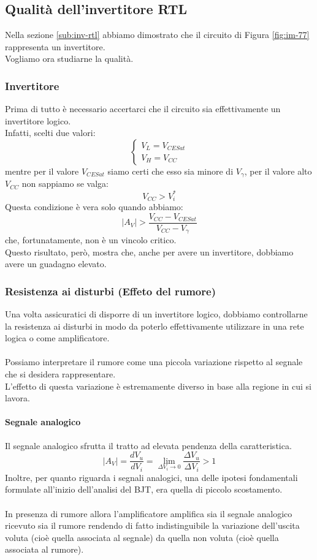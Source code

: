 \documentclass[../main.tex]{subfiles}
\begin{document}
	\subsection{Qualità dell'invertitore RTL}
	Nella sezione \ref{sub:inv-rtl} abbiamo dimostrato che il circuito di Figura \ref{fig:im-77} rappresenta un invertitore. \\
	Vogliamo ora studiarne la qualità.
	\subsubsection{Invertitore}
	Prima di tutto è necessario accertarci che il circuito sia effettivamente un invertitore logico. \\
	Infatti, scelti due valori:
	$$\begin{cases} V_L = V_{CESat} \\ V_H = V_{CC} \end{cases}$$
	mentre per il valore $V_{CESat}$ siamo certi che esso sia minore di $V_\gamma$, per il valore alto $V_{CC}$ non sappiamo se valga:
	$$V_{CC} > V_i^*$$
	Questa condizione è vera solo quando abbiamo:
	$$|A_V| > \frac{V_{CC} - V_{CESat}}{V_{CC} - V_\gamma}$$
	che, fortunatamente, non è un vincolo critico. \\
	Questo risultato, però, mostra che, anche per avere un invertitore, dobbiamo avere un guadagno elevato.
	\subsubsection{Resistenza ai disturbi (Effeto del rumore)}
	\label{subsub:res-dist}
	Una volta assicuratici di disporre di un invertitore logico, dobbiamo controllarne la resistenza ai disturbi in modo da poterlo effettivamente utilizzare in una rete logica o come amplificatore.\\\\
	Possiamo interpretare il rumore come una piccola variazione rispetto al segnale che si desidera rappresentare. \\
	L’effetto di questa variazione è estremamente diverso in base alla regione in cui si lavora.
	\paragraph{Segnale analogico}
	Il segnale analogico sfrutta il tratto ad elevata pendenza della caratteristica.
	$$|A_V| = \frac{dV_u}{dV_i} = \lim_{\Delta V_i \rightarrow 0} \frac{\Delta V_u}{\Delta V_i} > 1$$
	Inoltre, per quanto riguarda i segnali analogici, una delle ipotesi fondamentali formulate all’inizio dell’analisi del BJT, era quella di piccolo scostamento.\\\\
	In presenza di rumore allora l’amplificatore amplifica sia il segnale analogico ricevuto sia il rumore rendendo di fatto indistinguibile la variazione dell’uscita voluta (cioè quella associata al segnale) da quella non voluta (cioè quella associata al rumore).
\end{document}
